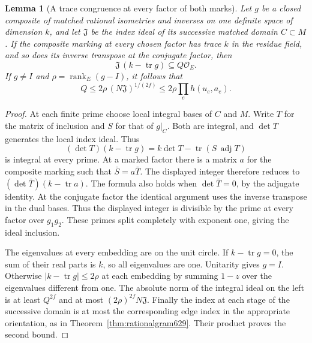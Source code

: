 \documentclass[a4paper,11pt]{article}
\newtheorem{lemma}[proposition]{Lemma}
\theoremstyle{definition}
\theoremstyle{remark}
\numberwithin{equation}{section}
\begin{document}
\begin{lemma}[A trace congruence at every factor of both marks]
\leavevmode\label{lem:matchedtrace638}
Let \(g\) be a closed composite of matched rational isometries and
inverses on one definite space of dimension \(k\), and let
\(\mathfrak J\) be the index ideal of its successive matched domain
\(C\subset M\). If the composite marking at every chosen factor
has trace \(k\) in the residue field, and so does its inverse
transpose at the conjugate factor, then
\[
       \mathfrak J\,(k-\operatorname{tr}g)\subseteq Q\mathcal O_E .
\]
If \(g\ne I\) and \(\rho=\operatorname{rank}_E(g-I)\), it follows
that
\[
               Q\le2\rho\,(N\mathfrak J)^{1/(2f)}
                    \le 2\rho\prod_e h(u_e,a_e).
\]
\end{lemma}
\begin{proof}
At each finite prime choose local integral bases of \(C\) and \(M\).
Write \(T\) for the matrix of inclusion and \(S\) for that of
\(g|_C\). Both are integral, and \(\det T\) generates the local
index ideal. Thus
\[
     (\det T)(k-\operatorname{tr}g)
            = k\det T-\operatorname{tr}(S\,\operatorname{adj}T)
\]
is integral at every prime. At a marked factor there is a matrix
\(a\) for the composite marking such that \(\bar S=a\bar T\).
The displayed integer therefore reduces to
\((\det\bar T)(k-\operatorname{tr}a)\). The formula also holds
when \(\det\bar T=0\), by the adjugate identity. At the conjugate
factor the identical argument uses the inverse transpose in the
dual bases. Thus the displayed integer is divisible by the prime
at every factor over \(g_1g_2\). These primes split completely with
exponent one, giving the ideal inclusion.

The eigenvalues at every embedding are on the unit circle. If
\(k-\operatorname{tr}g=0\), the sum of their real parts is \(k\),
so all eigenvalues are one. Unitarity gives \(g=I\). Otherwise
\(\lvert k-\operatorname{tr}g\rvert\le2\rho\) at each embedding
by summing \(1-z\) over the eigenvalues different from one. The
absolute norm of the integral ideal on the left is at least
\(Q^{2f}\) and at most \((2\rho)^{2f}N\mathfrak J\).
Finally the index at each stage of the successive domain is at
most the corresponding edge index in the appropriate orientation,
as in Theorem~\ref{thm:rationalgram629}. Their product proves the
second bound.
\end{proof}
\end{document}
